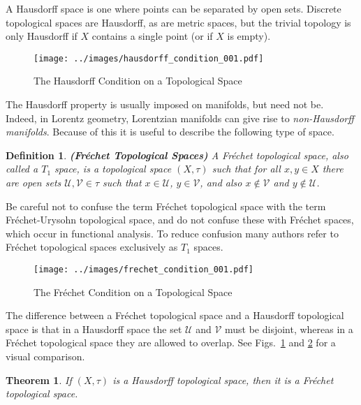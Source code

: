 \documentclass{article}
\theoremstyle{plain}
\newtheorem{theorem}{Theorem}[section]
\theoremstyle{normal}
\newtheorem{definition}{Definition}[section]
\begin{document}
        A Hausdorff space is one where points can be separated by open sets.
        Discrete topological spaces are Hausdorff, as are metric spaces, but
        the trivial topology is only Hausdorff if $X$ contains a single point
        (or if $X$ is empty).
        \begin{figure}
            \centering
            \texttt{[image: ../images/hausdorff\_condition\_001.pdf]}
            \caption{The Hausdorff Condition on a Topological Space}
            \label{fig:hausdorff_condition_001}
        \end{figure}
        The Hausdorff property is usually imposed on manifolds, but need not be.
        Indeed, in Lorentz geometry, Lorentzian manifolds can give rise to
        \textit{non-Hausdorff manifolds}. Because of this it is useful to
        describe the following type of space.
        \begin{definition}{\textbf{(Fr\'{e}chet Topological Spaces)}}
            A Fr\'{e}chet topological space, also called a $T_{1}$ space, is a
            topological space $(X,\tau)$ such that for all $x,y\in{X}$ there
            are open sets $\mathcal{U},\mathcal{V}\in\tau$ such that
            $x\in\mathcal{U}$, $y\in\mathcal{V}$, and also $x\notin\mathcal{V}$
            and $y\notin\mathcal{U}$.
        \end{definition}
        Be careful not to confuse the term Fr\'{e}chet topological space with
        the term Fr\'{e}chet-Urysohn topological space, and do not confuse these
        with Fr\'{e}chet spaces, which occur in functional analysis. To reduce
        confusion many authors refer to Fr\'{e}chet topological spaces
        exclusively as $T_{1}$ spaces.
        \begin{figure}
            \centering
            \texttt{[image: ../images/frechet\_condition\_001.pdf]}
            \caption{The Fr\'{e}chet Condition on a Topological Space}
            \label{fig:frechet_condition_001}
        \end{figure}
        The difference between a Fr\'{e}chet topological space and a Hausdorff
        topological space is that in a Hausdorff space the set $\mathcal{U}$
        and $\mathcal{V}$ must be disjoint, whereas in a Fr\'{e}chet
        topological space they are allowed to overlap. See
        Figs.~\ref{fig:hausdorff_condition_001} and
        \ref{fig:frechet_condition_001} for a visual comparison.
        \begin{theorem}
            If $(X,\tau)$ is a Hausdorff topological space, then it is a
            Fr\'{e}chet topological space.
        \end{theorem}
\end{document}
